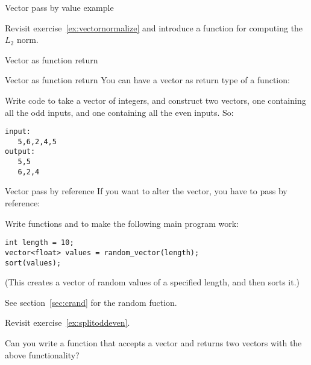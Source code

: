 \begin{block}{Vector pass by value example}
  \label{sl:vector-arg-ex}
\end{block}

\begin{exercise}
  \label{ex:vectornormalize-function}
  Revisit exercise~\ref{ex:vectornormalize} and introduce a function
  for computing the $L_2$ norm.
\end{exercise}

 {Vector as function return}

\begin{block}{Vector as function return}
  \label{sl:vector-return}
  You can have a vector as return type of a function:
\end{block}

\begin{exercise}
  \label{ex:splitoddeven}
  Write code to take a vector of integers, and construct two
  vectors, one containing all the odd inputs, and one containing all
  the even inputs. So:
\begin{verbatim}
input:
   5,6,2,4,5
output:
   5,5
   6,2,4
\end{verbatim}
\end{exercise}

\begin{block}{Vector pass by reference}
  \label{sl:vector-arg-ref}
  If you want to alter the vector, you have to pass by reference:
\end{block}

\begin{exercise}
  \label{ex:vec-rand-sort}
  Write functions  and  to make the following
  main program work:
\begin{verbatim}
int length = 10;
vector<float> values = random_vector(length);
sort(values);
\end{verbatim}
  (This creates a vector of random values of a specified length, and
then sorts it.)

See section~\ref{sec:crand} for the random fuction.
\end{exercise}

\begin{exercise}
  \label{ex:splitoddeven-function}
  Revisit exercise~\ref{ex:splitoddeven}. 

  Can you write a function that accepts a vector and returns two
  vectors with the above functionality?
\end{exercise}

